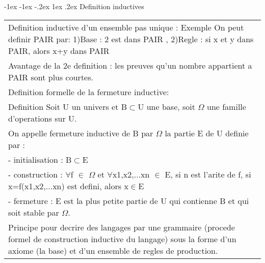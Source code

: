 \documentclass[5pt]{article}
\makeatletter
\renewcommand{\subsubsection}{\@startsection {section}{1}{\z@}%
             {-1ex \@plus -1ex \@minus -.2ex}%
             {1ex \@plus.2ex}%
             {\normalfont\scriptsize\sffamily\bfseries}}
\makeatother
\begin{document}
\begin{scriptsize}
\subsubsection{Definition inductives}
\begin{tabularx}{\linewidth}{|Y|}
\hline
Definition inductive d'un ensemble pas unique :
Exemple On peut definir PAIR par: 
1)Base : 2 est dans PAIR ,
2)Regle : si x et y dans PAIR, alors x+y dans PAIR\\
Avantage de la 2e definition : les preuves qu'un nombre appartient a PAIR sont plus courtes.
\\\hline
Definition formelle de la fermeture inductive:\\
Definition Soit U un univers et B$\subset$U une base, soit $\Omega$ une famille d'operations sur U.\\
On appelle fermeture inductive de B par $\Omega$ la partie E de U definie par :\\
- initialisation : B$\subset$E\\
- construction : $\forall$f $\in$ $\Omega$ et $\forall$x1,x2,...xn $\in$ E, si n est l’arite de f, si x=f(x1,x2,...xn) est defini, alors x$\in$E\\
- fermeture : E est la plus petite partie de U qui contienne B et qui soit stable par $\Omega$.\\
\hline
Principe pour decrire des langages par une grammaire (procede formel de construction inductive du langage) sous la forme d’un axiome (la base) et d'un ensemble de regles de production.
\\ \hline
\end{tabularx} 

\end{scriptsize}
\end{document}
